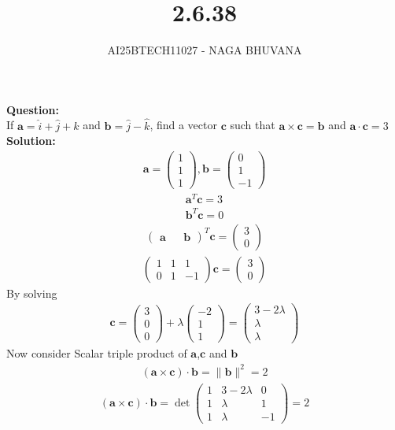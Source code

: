 \documentclass{beamer}
\title{2.6.38}
\author{AI25BTECH11027 - NAGA BHUVANA}
\theoremstyle{remark}
\newcommand{\myvec}[1]{\ensuremath{\begin{pmatrix}#1\end{pmatrix}}}
\let\vec\mathbf
\numberwithin{equation}{section}
\begin{document}
{\let\newpage\relax\maketitle}
\renewcommand{\thefigure}{\theenumi}
\renewcommand{\thetable}{\theenumi}
\noindent
		\textbf{Question:}\\
If $\vec{a}=\hat{i}+\hat{j}+\hat{k}$ and $\vec{b}=\hat{j}-\hat{k}$, find a vector $\vec{c}$ such that $\vec{a} \times \vec{c}=\vec{b}$ and $\vec{a} \cdot \vec{c}=3$\\
\textbf{Solution:}\\
\begin{align}
\vec{a}=\myvec{1\\1\\1},\vec{b}=\myvec{0\\1\\-1}
\end{align}
    \begin{align}
        \vec{a}^T\vec{c}=3\\
        \vec{b}^T\vec{c}=0
    \end{align}
    \begin{align}
        \myvec{\vec{a} && \vec{b}}^T\vec{c}=\myvec{3\\0}
    \end{align}
   \begin{align}
       \myvec{1&1&1\\0&1&-1}\vec{c}=\myvec{3\\0}
   \end{align}
   By solving\\
   \begin{align}
       \vec{c}=\myvec{3\\0\\0}+\lambda \myvec{-2\\1\\1}=\myvec{3-2\lambda \\ \lambda \\ \lambda}
   \end{align}
   Now consider Scalar triple product of $\vec{a}$,$\vec{c}$ and $\vec{b}$\\
   \begin{align}
   (\vec{a}\times\vec{c}) \cdot \vec{b}=\|\vec{b}\|^2=2
   \end{align}
   \begin{align}
   (\vec{a}\times\vec{c}) \cdot \vec{b}=\det \myvec{1&3-2\lambda&0 \\ 1&\lambda&1 \\1&\lambda&-1}=2
   \end{align}
\end{document}
